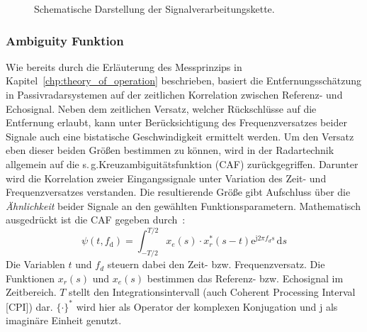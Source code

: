 \begin{figure}[htb]
    \caption{Schematische Darstellung der Signalverarbeitungskette.}\label{fig:signal_processing_chain}
\end{figure}

\subsubsection{Ambiguity Funktion}\label{sct:ambiguity_function}

Wie bereits durch die Erläuterung des Messprinzips in Kapitel~\ref{chp:theory_of_operation} beschrieben, basiert die Entfernungsschätzung in Passivradarsystemen auf der zeitlichen Korrelation zwischen Referenz- und Echosignal. Neben dem zeitlichen Versatz, welcher Rückschlüsse auf die Entfernung erlaubt, kann unter Berücksichtigung des Frequenzversatzes beider Signale auch eine bistatische Geschwindigkeit ermittelt werden. Um den Versatz eben dieser beiden Größen bestimmen zu können, wird in der Radartechnik allgemein auf die s.\,g.\@ Kreuzambiguitätsfunktion (CAF) zurückgegriffen. Darunter wird die Korrelation zweier Eingangssignale unter Variation des Zeit- und Frequenzversatzes verstanden. Die resultierende Größe gibt Aufschluss über die \emph{Ähnlichkeit} beider Signale an den gewählten Funktionsparametern. Mathematisch ausgedrückt ist die CAF gegeben durch~\cite[S.~132]{Malanowski2019}:%
%
\begin{equation}\label{equ:cross_ambiguity_function}
    \psi(t, f_{\text{d}}) = \int_{-T/2}^{T/2} {x_{e}(s) \cdot x_{r}^{*}} \left( s - t \right)\mathrm{e}^{\mathrm{j} 2 \pi f_{d} s} \, \text{d} s
\end{equation}%
%
Die Variablen \(t\) und \(f_{d}\) steuern dabei den Zeit- bzw. Frequenzversatz. Die Funktionen \(x_{r}(s)\) und \(x_{e}(s)\) bestimmen das Referenz- bzw. Echosignal im Zeitbereich. \(T\) stellt den Integrationsintervall (auch Coherent Processing Interval [CPI]) dar. \({\{}\cdot{\}}^{*}\) wird hier als Operator der komplexen Konjugation und \(\mathrm{j}\) als imaginäre Einheit genutzt.

